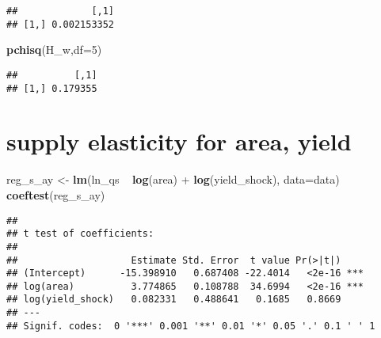 \documentclass[]{article}
\newenvironment{Shaded}{\begin{snugshade}}{\end{snugshade}}
\newcommand{\KeywordTok}[1]{\textcolor[rgb]{0.13,0.29,0.53}{\textbf{{#1}}}}
\newcommand{\DataTypeTok}[1]{\textcolor[rgb]{0.13,0.29,0.53}{{#1}}}
\newcommand{\DecValTok}[1]{\textcolor[rgb]{0.00,0.00,0.81}{{#1}}}
\newcommand{\StringTok}[1]{\textcolor[rgb]{0.31,0.60,0.02}{{#1}}}
\newcommand{\NormalTok}[1]{{#1}}
\begin{document}
\begin{verbatim}
##             [,1]
## [1,] 0.002153352
\end{verbatim}

\begin{Shaded}
\begin{Highlighting}[]
\KeywordTok{pchisq}\NormalTok{(H_w,}\DataTypeTok{df=}\DecValTok{5}\NormalTok{)}
\end{Highlighting}
\end{Shaded}

\begin{verbatim}
##          [,1]
## [1,] 0.179355
\end{verbatim}

\section{supply elasticity for area,
yield}\label{supply-elasticity-for-area-yield}

\begin{Shaded}
\begin{Highlighting}[]
\NormalTok{reg_s_ay <-}\StringTok{ }\KeywordTok{lm}\NormalTok{(ln_qs ~}\StringTok{ }\KeywordTok{log}\NormalTok{(area) +}\StringTok{ }\KeywordTok{log}\NormalTok{(yield_shock), }\DataTypeTok{data=}\NormalTok{data)}
\KeywordTok{coeftest}\NormalTok{(reg_s_ay)}
\end{Highlighting}
\end{Shaded}

\begin{verbatim}
## 
## t test of coefficients:
## 
##                    Estimate Std. Error  t value Pr(>|t|)    
## (Intercept)      -15.398910   0.687408 -22.4014   <2e-16 ***
## log(area)          3.774865   0.108788  34.6994   <2e-16 ***
## log(yield_shock)   0.082331   0.488641   0.1685   0.8669    
## ---
## Signif. codes:  0 '***' 0.001 '**' 0.01 '*' 0.05 '.' 0.1 ' ' 1
\end{verbatim}
\end{document}
